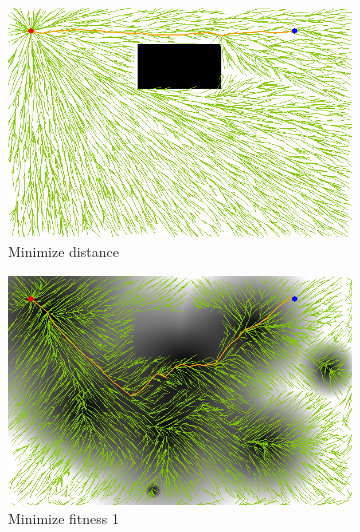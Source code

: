 \documentclass[conference]{IEEEtran}
\begin{document}
\begin{figure}
	\centering
	\begin{subfigure}[b]{0.45\linewidth}
		\centering
		\includegraphics[width=\textwidth]{fig/sim4-obstacle/MORRTstar01-1-0.png}
		\caption{Minimize distance}
		\label{fig:sim:obs:distance}
	\end{subfigure}
	\begin{subfigure}[b]{0.45\linewidth}
		\centering
		\includegraphics[width=\textwidth]{fig/sim4-obstacle/MORRTstar01-1-1.png}
		\caption{Minimize fitness 1}
		\label{fig:sim:obs:fitness1}
	\end{subfigure}  \\
	\begin{subfigure}[b]{0.45\linewidth}
		\centering

\end{subfigure}
\end{figure}
\end{document}
